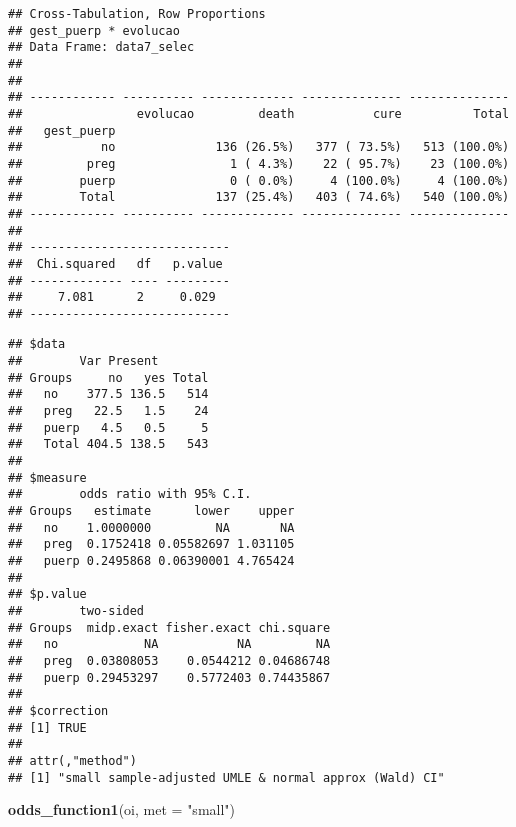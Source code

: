 \documentclass[
]{article}
\newenvironment{Shaded}{\begin{snugshade}}{\end{snugshade}}
\newcommand{\DataTypeTok}[1]{\textcolor[rgb]{0.13,0.29,0.53}{#1}}
\newcommand{\KeywordTok}[1]{\textcolor[rgb]{0.13,0.29,0.53}{\textbf{#1}}}
\newcommand{\NormalTok}[1]{#1}
\newcommand{\OperatorTok}[1]{\textcolor[rgb]{0.81,0.36,0.00}{\textbf{#1}}}
\newcommand{\StringTok}[1]{\textcolor[rgb]{0.31,0.60,0.02}{#1}}
\begin{document}
\begin{verbatim}
## Cross-Tabulation, Row Proportions  
## gest_puerp * evolucao  
## Data Frame: data7_selec  
## 
## 
## ------------ ---------- ------------- -------------- --------------
##                evolucao         death           cure          Total
##   gest_puerp                                                       
##           no              136 (26.5%)   377 ( 73.5%)   513 (100.0%)
##         preg                1 ( 4.3%)    22 ( 95.7%)    23 (100.0%)
##        puerp                0 ( 0.0%)     4 (100.0%)     4 (100.0%)
##        Total              137 (25.4%)   403 ( 74.6%)   540 (100.0%)
## ------------ ---------- ------------- -------------- --------------
## 
## ----------------------------
##  Chi.squared   df   p.value 
## ------------- ---- ---------
##     7.081      2     0.029  
## ----------------------------
\end{verbatim}

\begin{Shaded}
\end{Shaded}

\begin{verbatim}
## $data
##        Var Present
## Groups     no   yes Total
##   no    377.5 136.5   514
##   preg   22.5   1.5    24
##   puerp   4.5   0.5     5
##   Total 404.5 138.5   543
## 
## $measure
##        odds ratio with 95% C.I.
## Groups   estimate      lower    upper
##   no    1.0000000         NA       NA
##   preg  0.1752418 0.05582697 1.031105
##   puerp 0.2495868 0.06390001 4.765424
## 
## $p.value
##        two-sided
## Groups  midp.exact fisher.exact chi.square
##   no            NA           NA         NA
##   preg  0.03808053    0.0544212 0.04686748
##   puerp 0.29453297    0.5772403 0.74435867
## 
## $correction
## [1] TRUE
## 
## attr(,"method")
## [1] "small sample-adjusted UMLE & normal approx (Wald) CI"
\end{verbatim}

\begin{Shaded}
\begin{Highlighting}[]
\KeywordTok{odds_function1}\NormalTok{(oi, }\DataTypeTok{met =} \StringTok{"small"}\NormalTok{)}
\end{Highlighting}
\end{Shaded}
\end{document}

